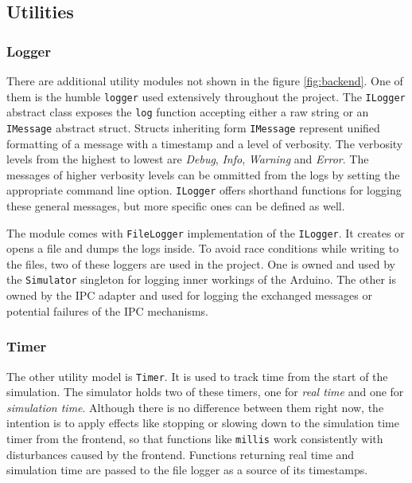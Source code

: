 \subsection{Utilities}

\subsubsection{Logger} \label{subsub:logger}

There are additional utility modules not shown in the figure \ref{fig:backend}. One of them is the humble \texttt{logger} used extensively throughout the project. The \texttt{ILogger} abstract class exposes the \texttt{log} function accepting either a raw string or an \texttt{IMessage} abstract struct. Structs inheriting form \texttt{IMessage} represent unified formatting of a message with a timestamp and a level of verbosity. The verbosity levels from the highest to lowest are \textit{Debug}, \textit{Info}, \textit{Warning} and \textit{Error}. The messages of higher verbosity levels can be ommitted from the logs by setting the appropriate command line option. \texttt{ILogger} offers shorthand functions for logging these general messages, but more specific ones can be defined as well.

The module comes with \texttt{FileLogger} implementation of the \texttt{ILogger}. It creates or opens a file and dumps the logs inside. To avoid race conditions while writing to the files, two of these loggers are used in the project. One is owned and used by the \texttt{Simulator} singleton for logging inner workings of the Arduino. The other is owned by the IPC adapter and used for logging the exchanged messages or potential failures of the IPC mechanisms.

\subsubsection{Timer}

The other utility model is \texttt{Timer}. It is used to track time from the start of the simulation. The simulator holds two of these timers, one for \textit{real time} and one for \textit{simulation time}. Although there is no difference between them right now, the intention is to apply effects like stopping or slowing down to the simulation time timer from the frontend, so that functions like \texttt{millis} work consistently with disturbances caused by the frontend. Functions returning real time and simulation time are passed to the file logger as a source of its timestamps.

